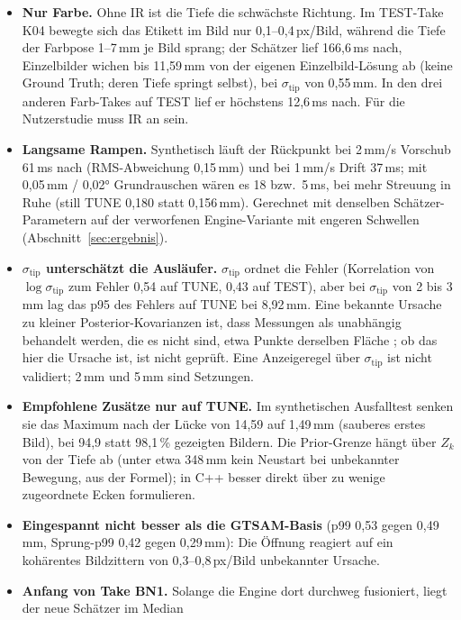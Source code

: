 \documentclass[11pt,a4paper,fleqn]{article}
\newcommand{\stip}{\sigma_{\mathrm{tip}}}
\begin{document}
\begin{itemize}
  \item \textbf{Nur Farbe.} Ohne IR ist die Tiefe die schwächste Richtung. Im TEST-Take K04 bewegte sich das
        Etikett im Bild nur 0,1--0,4\,px/Bild, während die Tiefe der Farbpose 1--7\,mm je Bild sprang; der Schätzer
        lief 166,6\,ms nach, Einzelbilder wichen bis 11,59\,mm von der eigenen Einzelbild-Lösung ab (keine Ground
        Truth; deren Tiefe springt selbst), bei $\stip$ von 0,55\,mm. In den drei anderen Farb-Takes auf TEST lief
        er höchstens 12,6\,ms nach. Für die Nutzerstudie muss IR an sein.
  \item \textbf{Langsame Rampen.} Synthetisch läuft der Rückpunkt bei 2\,mm/s Vorschub 61\,ms nach
        (RMS-Abweichung 0,15\,mm) und bei 1\,mm/s Drift 37\,ms; mit 0,05\,mm / 0,02° Grundrauschen wären es 18 bzw.\
        5\,ms, bei mehr Streuung in Ruhe (still TUNE 0,180 statt 0,156\,mm). Gerechnet mit denselben
        Schätzer-Parametern auf der verworfenen Engine-Variante mit engeren Schwellen (Abschnitt~\ref{sec:ergebnis}).
  \item \textbf{$\stip$ unterschätzt die Ausläufer.} $\stip$ ordnet die Fehler (Korrelation von $\log\stip$ zum
        Fehler 0,54 auf TUNE, 0,43 auf TEST), aber bei $\stip$ von 2 bis 3\,mm lag das p95 des Fehlers auf TUNE bei
        8,92\,mm. Eine bekannte Ursache zu kleiner Posterior-Kovarianzen ist, dass Messungen als unabhängig
        behandelt werden, die es nicht sind, etwa Punkte derselben Fläche \cite[S.~30]{lepetit2005monocular}; ob das
        hier die Ursache ist, ist nicht geprüft. Eine Anzeigeregel über $\stip$ ist nicht validiert; 2\,mm und
        5\,mm sind Setzungen.
  \item \textbf{Empfohlene Zusätze nur auf TUNE.} Im synthetischen Ausfalltest senken sie das Maximum nach der
        Lücke von 14,59 auf 1,49\,mm (sauberes erstes Bild), bei 94,9 statt 98,1\,\% gezeigten Bildern. Die Prior-Grenze hängt über $Z_k$
        von der Tiefe ab (unter etwa 348\,mm kein Neustart bei unbekannter Bewegung, aus der Formel); in C++ besser
        direkt über zu wenige zugeordnete Ecken formulieren.
  \item \textbf{Eingespannt nicht besser als die GTSAM-Basis} (p99 0,53 gegen 0,49\,mm, Sprung-p99 0,42 gegen
        0,29\,mm): Die Öffnung reagiert auf ein kohärentes Bildzittern von 0,3--0,8\,px/Bild unbekannter Ursache.
  \item \textbf{Anfang von Take BN1.} Solange die Engine dort durchweg fusioniert, liegt der neue Schätzer im Median

\end{itemize}
\end{document}
